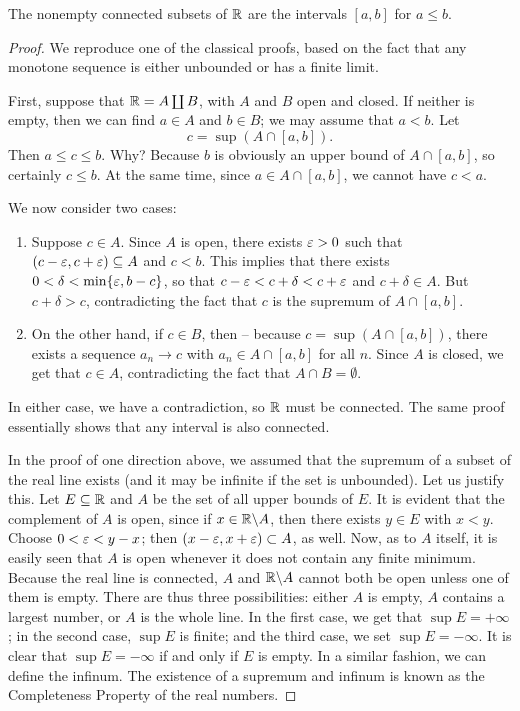 \begin{theorem}
	The nonempty connected subsets of $\mathbb R$ are the intervals $[a,b]$ for $a \le b$.
\end{theorem}
\begin{proof}
	We reproduce one of the classical proofs, based on the fact that any monotone sequence is either unbounded or has a finite limit.
	
	First, suppose that $\mathbb R=A \coprod B$, with $A$ and $B$ open and closed. If neither is empty, then we can find $a\in A$ and $b \in B$; we may assume that $a<b$. Let $$c=\sup(A \cap [a,b]).$$ Then $a \le c \le b$. Why? Because $b$ is obviously an upper bound of $A \cap [a,b]$, so certainly $c \le b$. At the same time, since $a \in A \cap [a,b]$, we cannot have $c<a$.
	
	We now consider two cases:
	\begin{enumerate}
		\item Suppose $c \in A$. Since $A$ is open, there exists $\varepsilon>0$ such that $(c-\varepsilon,c+\varepsilon) \subseteq A$ and $c<b$. This implies that there exists $0<\delta<\min\{\varepsilon, b-c\}$, so that $c-\varepsilon<c+\delta<c+\varepsilon$ and $c+\delta \in A$. But $c+\delta>c$, contradicting the fact that $c$ is the supremum of $A \cap [a,b]$.
		
		\item On the other hand, if $c \in B$, then -- because $c=\sup(A \cap [a,b])$, there exists a sequence $a_n \rightarrow c$ with $a_n \in A \cap [a,b]$ for all $n$. Since $A$ is closed, we get that $c \in A$, contradicting the fact that $A \cap B=\emptyset$.
	\end{enumerate}
	In either case, we have a contradiction, so $\mathbb R$ must be connected. The same proof essentially shows that any interval is also connected.
	
	In the proof of one direction above, we assumed that the supremum of a subset of the real line exists (and it may be infinite if the set is unbounded). Let us justify this. Let $E \subseteq \mathbb R$ and $A$ be the set of all upper bounds of $E$. It is evident that the complement of $A$ is open, since if $x \in \mathbb R \backslash A$, then there exists $y \in E$ with $x<y$. Choose $0<\varepsilon<y-x$; then $(x-\varepsilon,x+\varepsilon) \subset A$, as well. Now, as to $A$ itself, it is easily seen that $A$ is open whenever it does not contain any finite minimum. Because the real line is connected, $A$ and $\mathbb R \backslash A$ cannot both be open unless one of them is empty. There are thus three possibilities: either $A$ is empty, $A$ contains a largest number, or $A$ is the whole line. In the first case, we get that $\sup E=+\infty$; in the second case, $\sup E$ is finite; and the third case, we set $\sup E=-\infty$. It is clear that $\sup E=-\infty$ if and only if $E$ is empty. In a similar fashion, we can define the infinum. The existence of a supremum and infinum is known as the Completeness Property of the real numbers.
	

\end{proof}
